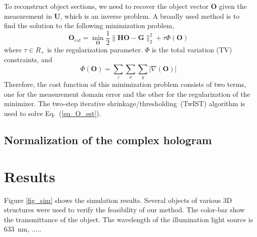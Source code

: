\documentclass[9pt,twocolumn,twoside]{osajnl}
\begin{document}
To reconstruct object sections, we need to recover the object vector $\mathbf{O}$ given the measurement in $\mathbf{U}$, which is
an inverse problem. A broadly used method is to find the solution to the following minimization problem,
\begin{equation}
\mathbf{O}_{est} = \min_\mathbf{O} \frac{1}{2} \lVert \mathbf{H}\mathbf{O} - \mathbf{G} \rVert _2^2  + \tau \Phi(\mathbf{O})
\label{eq_O_est}
\end{equation}
where $\tau \in R_+$ is the regularization parameter. $\Phi$ is the total variation (TV) constraints, and
\begin{equation}
\Phi(\mathbf{O})=\sum_z\sum_x\sum_y\lvert \nabla (\mathbf{O})\rvert
\label{eq_TV}
\end{equation}
Therefore, the cost function of this minimization problem consists of two terms, one for the measurement domain error and the other for the regularization of the minimizer. 
The two-step iterative shrinkage/thresholding~(TwIST) algorithm is used to solve Eq.~(\ref{eq_O_est}).
%
%

\subsection{Normalization of the complex hologram}

\section{Results}\label{sec_results}

Figure \ref{fig_sim} shows the simulation results. 
Several objects of various 3D structures were used to verify the feasibility of our method. The color-bar show the transmittance of the object. 
The wavelength of the illumination light source is \SI{633}{\nano\meter}, ..... 
\end{document}
